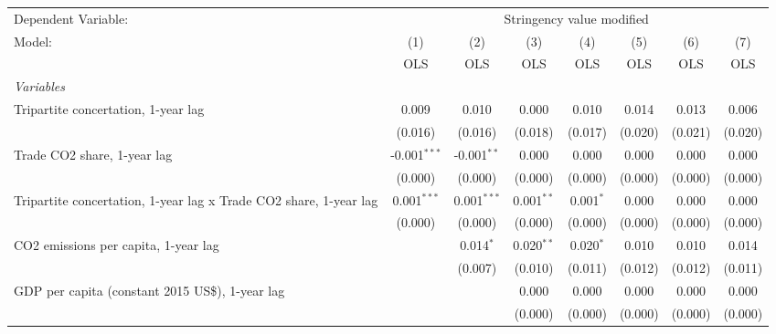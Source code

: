 
\begingroup
\centering
\begin{tabular}{lccccccc}
   \toprule
   Dependent Variable: & \multicolumn{7}{c}{Stringency value modified}\\
   Model:                                                            & (1)            & (2)           & (3)          & (4)         & (5)     & (6)     & (7)\\  
                                                                     &  OLS           & OLS           & OLS          & OLS         & OLS     & OLS     & OLS\\  
   \midrule
   \emph{Variables}\\
   Tripartite concertation, 1-year lag                               & 0.009          & 0.010         & 0.000        & 0.010       & 0.014   & 0.013   & 0.006\\   
                                                                     & (0.016)        & (0.016)       & (0.018)      & (0.017)     & (0.020) & (0.021) & (0.020)\\   
   Trade CO2 share, 1-year lag                                       & -0.001$^{***}$ & -0.001$^{**}$ & 0.000        & 0.000       & 0.000   & 0.000   & 0.000\\   
                                                                     & (0.000)        & (0.000)       & (0.000)      & (0.000)     & (0.000) & (0.000) & (0.000)\\   
   Tripartite concertation, 1-year lag x Trade CO2 share, 1-year lag & 0.001$^{***}$  & 0.001$^{***}$ & 0.001$^{**}$ & 0.001$^{*}$ & 0.000   & 0.000   & 0.000\\   
                                                                     & (0.000)        & (0.000)       & (0.000)      & (0.000)     & (0.000) & (0.000) & (0.000)\\   
   CO2 emissions per capita, 1-year lag                              &                & 0.014$^{*}$   & 0.020$^{**}$ & 0.020$^{*}$ & 0.010   & 0.010   & 0.014\\   
                                                                     &                & (0.007)       & (0.010)      & (0.011)     & (0.012) & (0.012) & (0.011)\\   
   GDP per capita (constant 2015 US\$), 1-year lag                   &                &               & 0.000        & 0.000       & 0.000   & 0.000   & 0.000\\   
                                                                     &                &               & (0.000)      & (0.000)     & (0.000) & (0.000) & (0.000)\\   

\end{tabular}
